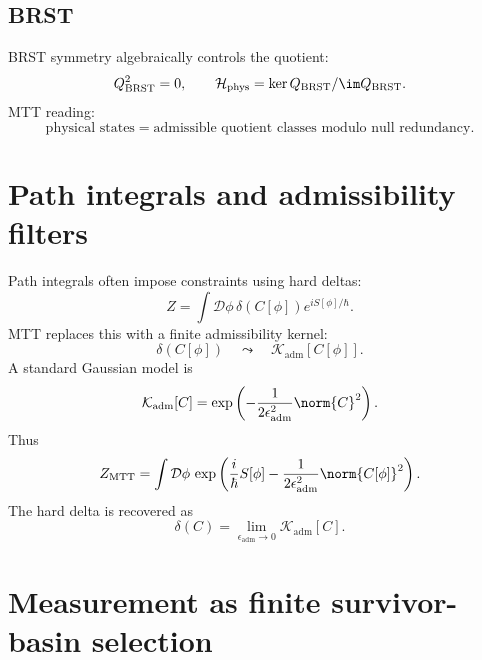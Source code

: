 \documentclass[11pt]{article}
\begin{document}
\subsection{BRST}

BRST symmetry algebraically controls the quotient:
\begin{equation}
Q_{\mathrm{BRST}}^2=0,\qquad
\mathcal H_{\mathrm{phys}}=\ker Q_{\mathrm{BRST}}/\im Q_{\mathrm{BRST}}.
\end{equation}
MTT reading:
\[
\boxed{\text{physical states}=\text{admissible quotient classes modulo null redundancy}.}
\]

\section{Path integrals and admissibility filters}

Path integrals often impose constraints using hard deltas:
\begin{equation}
Z=\int \mathcal D\phi\,\delta(C[\phi])e^{iS[\phi]/\hbar}.
\end{equation}
MTT replaces this with a finite admissibility kernel:
\begin{equation}
\delta(C[\phi])\quad\leadsto\quad \mathcal K_{\mathrm{adm}}[C[\phi]].
\end{equation}
A standard Gaussian model is
\begin{equation}
\mathcal K_{\mathrm{adm}}[C]
=\exp\left(-\frac{1}{2\epsilon_{\mathrm{adm}}^2}\norm{C}^2\right).
\end{equation}
Thus
\begin{equation}
Z_{\mathrm{MTT}}=
\int \mathcal D\phi\,
\exp\left(\frac{i}{\hbar}S[\phi]
-\frac{1}{2\epsilon_{\mathrm{adm}}^2}\norm{C[\phi]}^2\right).
\end{equation}
The hard delta is recovered as
\begin{equation}
\delta(C)=\lim_{\epsilon_{\mathrm{adm}}\to 0}\mathcal K_{\mathrm{adm}}[C].
\end{equation}

\section{Measurement as finite survivor-basin selection}
\end{document}
